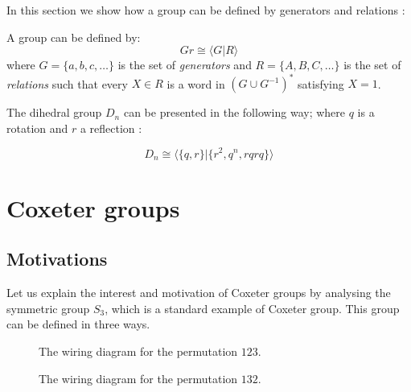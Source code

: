 In this section we show how a group can be defined by generators and relations :

\begin{definition}
  A group can be defined by:
  \begin{equation}
    Gr \cong \langle G | R\rangle
  \end{equation}
where $G = \{a,b,c,\dots\}$ is the set of \emph{generators} and $R = \{A,B,C,\dots\}$ is the set of \emph{relations} such that every $X \in R$ is a word in $(G\cup G^{-1})^*$ satisfying $X = 1$.
\end{definition}

\begin{example}
The dihedral group $D_n$ can be presented in the following way; where $q$ is a rotation and $r$ a reflection :

$$D_n \cong \langle \{q,r\} | \{r^2, q^n, rqrq\} \rangle$$
\end{example}


\chapter{Coxeter groups}

\section{Motivations}
Let us explain the interest and motivation of Coxeter groups by analysing the symmetric group $S_3$, which is a standard example of Coxeter group. This group can be defined in three ways.

\begin{figure}
  \begin {center}

  \caption{The wiring diagram for the permutation $123$.}
  \end{center}
\label{fig:wiring}
\end{figure}

\begin{figure}
  \begin {center}
  \caption{The wiring diagram for the permutation $132$.}
  \end{center}
\label{fig:wiring_23}
\end{figure}


